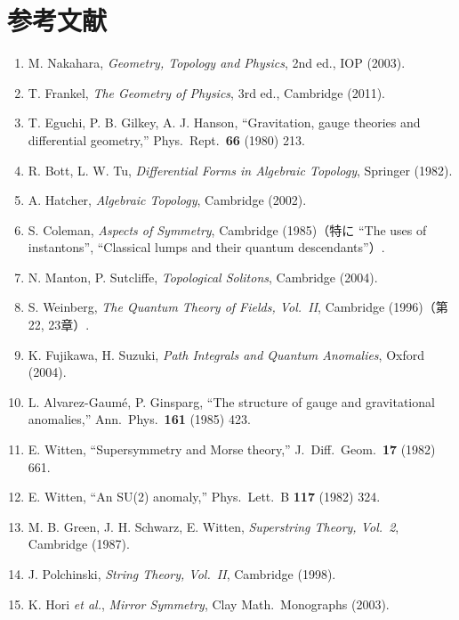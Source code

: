 \printsolutions

\backmatter
\chapter*{参考文献}
\begin{enumerate}
  \item M. Nakahara, \textit{Geometry, Topology and Physics}, 2nd ed., IOP (2003).
  \item T. Frankel, \textit{The Geometry of Physics}, 3rd ed., Cambridge (2011).
  \item T. Eguchi, P. B. Gilkey, A. J. Hanson, ``Gravitation, gauge theories and differential geometry,'' Phys.\ Rept.\ \textbf{66} (1980) 213.
  \item R. Bott, L. W. Tu, \textit{Differential Forms in Algebraic Topology}, Springer (1982).
  \item A. Hatcher, \textit{Algebraic Topology}, Cambridge (2002).
  \item S. Coleman, \textit{Aspects of Symmetry}, Cambridge (1985)（特に ``The uses of instantons'', ``Classical lumps and their quantum descendants''）.
  \item N. Manton, P. Sutcliffe, \textit{Topological Solitons}, Cambridge (2004).
  \item S. Weinberg, \textit{The Quantum Theory of Fields, Vol.~II}, Cambridge (1996)（第22, 23章）.
  \item K. Fujikawa, H. Suzuki, \textit{Path Integrals and Quantum Anomalies}, Oxford (2004).
  \item L. Alvarez-Gaum\'e, P. Ginsparg, ``The structure of gauge and gravitational anomalies,'' Ann.\ Phys.\ \textbf{161} (1985) 423.
  \item E. Witten, ``Supersymmetry and Morse theory,'' J.\ Diff.\ Geom.\ \textbf{17} (1982) 661.
  \item E. Witten, ``An SU(2) anomaly,'' Phys.\ Lett.\ B \textbf{117} (1982) 324.
  \item M. B. Green, J. H. Schwarz, E. Witten, \textit{Superstring Theory, Vol.~2}, Cambridge (1987).
  \item J. Polchinski, \textit{String Theory, Vol.~II}, Cambridge (1998).
  \item K. Hori \textit{et al.}, \textit{Mirror Symmetry}, Clay Math.\ Monographs (2003).
\end{enumerate}


